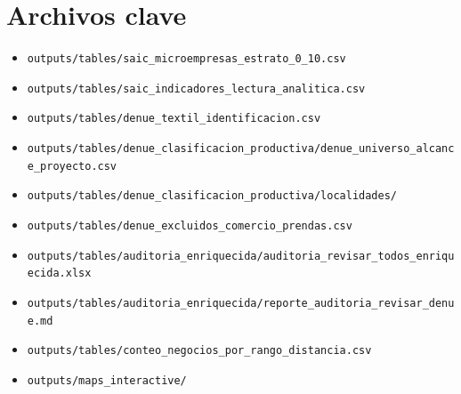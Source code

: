 \documentclass[11pt,letterpaper]{article}
\begin{document}
\section{Archivos clave}

\begin{itemize}
  \item \texttt{outputs/tables/saic\_microempresas\_estrato\_0\_10.csv}
  \item \texttt{outputs/tables/saic\_indicadores\_lectura\_analitica.csv}
  \item \texttt{outputs/tables/denue\_textil\_identificacion.csv}
  \item \texttt{outputs/tables/denue\_clasificacion\_productiva/denue\_universo\_alcance\_proyecto.csv}
  \item \texttt{outputs/tables/denue\_clasificacion\_productiva/localidades/}
  \item \texttt{outputs/tables/denue\_excluidos\_comercio\_prendas.csv}
  \item \texttt{outputs/tables/auditoria\_enriquecida/auditoria\_revisar\_todos\_enriquecida.xlsx}
  \item \texttt{outputs/tables/auditoria\_enriquecida/reporte\_auditoria\_revisar\_denue.md}
  \item \texttt{outputs/tables/conteo\_negocios\_por\_rango\_distancia.csv}
  \item \texttt{outputs/maps\_interactive/}
\end{itemize}
\end{document}

